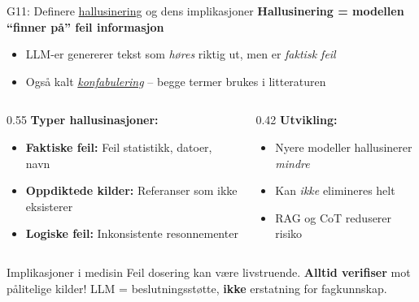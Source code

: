 \documentclass[aspectratio=169, 10pt]{beamer}
\begin{document}
\begin{frame}{G11: Definere \href{https://en.wikipedia.org/wiki/Hallucination_(artificial_intelligence)}{hallusinering} og dens implikasjoner}
    \textbf{Hallusinering = modellen ``finner på'' feil informasjon}
    \begin{itemize}
        \item LLM-er genererer tekst som \textit{høres} riktig ut, men er \textit{faktisk feil}
        \item Også kalt \href{https://en.wikipedia.org/wiki/Confabulation_(neural_networks)}{\textit{konfabulering}} -- begge termer brukes i litteraturen
    \end{itemize}

    \vspace{0.15cm}
    \begin{columns}[T]
        \begin{column}{0.55\textwidth}
            \textbf{Typer hallusinasjoner:}
            \footnotesize
            \begin{itemize}
                \item \textbf{Faktiske feil:} Feil statistikk, datoer, navn
                \item \textbf{Oppdiktede kilder:} Referanser som ikke eksisterer
                \item \textbf{Logiske feil:} Inkonsistente resonnementer
            \end{itemize}
        \end{column}
        \begin{column}{0.42\textwidth}
            \textbf{Utvikling:}
            \footnotesize
            \begin{itemize}
                \item Nyere modeller hallusinerer \textit{mindre}
                \item Kan \textit{ikke} elimineres helt
                \item RAG og CoT reduserer risiko
            \end{itemize}
        \end{column}
    \end{columns}

    \vspace{0.1cm}
    \begin{alertblock}{\footnotesize Implikasjoner i medisin}
        \footnotesize
        Feil dosering kan være livstruende. \textbf{Alltid verifiser} mot pålitelige kilder! LLM = beslutningsstøtte, \textbf{ikke} erstatning for fagkunnskap.
    \end{alertblock}
\end{frame}
\end{document}
